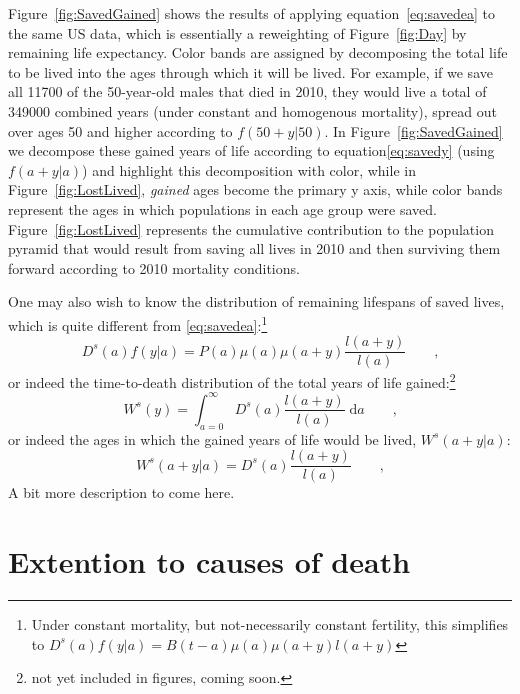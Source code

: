 \documentclass{article}
\newcommand{\dd}{\; \mathrm{d}}
\newcommand{\tc}{\quad\quad\text{,}}
\begin{document}
Figure~\ref{fig:SavedGained} shows the results of applying
equation~\eqref{eq:savedea} to the same US data, which is essentially a
reweighting of Figure~\ref{fig:Day} by remaining life expectancy. Color bands
are assigned by decomposing the total life to be lived into the ages through
which it will be lived. For example, if we save all 11700 of the 50-year-old
males that died in 2010, they would live a total of 349000 combined years (under
constant and homogenous mortality), spread out over ages 50 and higher according
to $f(50+y|50)$. In Figure~\ref{fig:SavedGained} we decompose these gained
years of life according to equation\eqref{eq:savedy} (using $f(a+y|a)$) and
highlight this decomposition with color, while in Figure~\ref{fig:LostLived}, \textit{gained} ages become the primary y axis,
while color bands represent the ages in which populations in each age group were
saved. Figure~\ref{fig:LostLived} represents the cumulative contribution to the
population pyramid that would result from saving all lives in 2010 and then
surviving them forward according to 2010 mortality conditions.

One may also wish to know the distribution of remaining lifespans of saved
lives, which is quite different from \eqref{eq:savedea}:\footnote{Under constant mortality, but
not-necessarily constant fertility, this simplifies to $D^s(a)f(y|a) =
B(t-a)\mu(a)\mu(a+y)l(a+y)$}
\begin{equation}
\label{eq:savedy}
D^s(a)f(y|a) = P(a)\mu(a)\mu(a+y) \frac{l(a+y)}{l(a)} \tc
\end{equation}
or indeed the time-to-death distribution of the total years of life
gained:\footnote{not yet included in figures, coming soon.}
\begin{equation}
\label{eq:gainedy}
W^s(y) = \int_{a=0}^\infty D^s(a)\frac{l(a+y)}{l(a)} \dd a \tc
\end{equation}
or indeed the ages in which the gained years of life would be lived,
$W^s(a+y|a)$:
\begin{equation}
\label{eq:gaineday}
W^s(a+y|a) = D^s(a)\frac{l(a+y)}{l(a)} \tc
\end{equation}
A bit more description to come here.

\section{Extention to causes of death}
\end{document}
